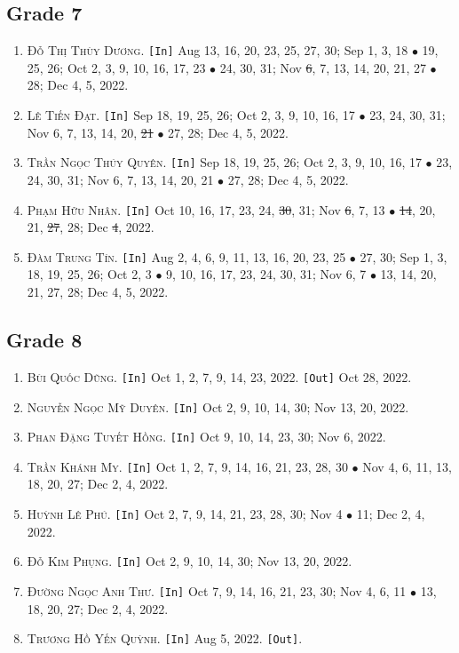 \documentclass{article}
\numberwithin{equation}{section}
\begin{document}
\subsection{Grade 7}
\begin{enumerate}
	\item \textsc{Đỗ Thị Thùy Dương.} \texttt{[In]} Aug 13, 16, 20, 23, 25, 27, 30; Sep 1, 3, 18 $\bullet$ 19, 25, 26; Oct 2, 3, 9, 10, 16, 17, 23 $\bullet$ 24, 30, 31; Nov \st{6}, 7, 13, 14, 20, 21, 27 $\bullet$ 28; Dec 4, 5, 2022.
	\item \textsc{Lê Tiến Đạt.} \texttt{[In]} Sep 18, 19, 25, 26; Oct 2, 3, 9, 10, 16, 17 $\bullet$ 23, 24, 30, 31; Nov 6, 7, 13, 14, 20, \st{21} $\bullet$ 27, 28; Dec 4, 5, 2022.
	\item \textsc{Trần Ngọc Thúy Quyên.} \texttt{[In]} Sep 18, 19, 25, 26; Oct 2, 3, 9, 10, 16, 17 $\bullet$ 23, 24, 30, 31; Nov 6, 7, 13, 14, 20, 21 $\bullet$ 27, 28; Dec 4, 5, 2022.
	\item \textsc{Phạm Hữu Nhân.} \texttt{[In]} Oct 10, 16, 17, 23, 24, \st{30}, 31; Nov \st{6}, 7, 13 $\bullet$ \st{14}, 20, 21, \st{27}, 28; Dec \st{4}, 2022.
	\item \textsc{Đàm Trung Tín.} \texttt{[In]} Aug 2, 4, 6, 9, 11, 13, 16, 20, 23, 25 $\bullet$ 27, 30; Sep 1, 3, 18, 19, 25, 26; Oct 2, 3 $\bullet$ 9, 10, 16, 17, 23, 24, 30, 31; Nov 6, 7 $\bullet$ 13, 14, 20, 21, 27, 28; Dec 4, 5, 2022.
\end{enumerate}

\subsection{Grade 8}
\begin{enumerate}
	\item \textsc{Bùi Quốc Dũng.} \texttt{[In]} Oct 1, 2, 7, 9, 14, 23, 2022. \texttt{[Out]} Oct 28, 2022.
	\item \textsc{Nguyễn Ngọc Mỹ Duyên.} \texttt{[In]} Oct 2, 9, 10, 14, 30; Nov 13, 20, 2022.
	\item \textsc{Phan Đặng Tuyết Hồng.} \texttt{[In]} Oct 9, 10, 14, 23, 30; Nov 6, 2022.
	\item \textsc{Trần Khánh My.} \texttt{[In]} Oct 1, 2, 7, 9, 14, 16, 21, 23, 28, 30 $\bullet$ Nov 4, 6, 11, 13, 18, 20, 27; Dec 2, 4, 2022.
	\item \textsc{Huỳnh Lê Phú.} \texttt{[In]} Oct 2, 7, 9, 14, 21, 23, 28, 30; Nov 4 $\bullet$ 11; Dec 2, 4, 2022.
	\item \textsc{Đỗ Kim Phụng.} \texttt{[In]} Oct 2, 9, 10, 14, 30; Nov 13, 20, 2022.
	\item \textsc{Đường Ngọc Anh Thư.} \texttt{[In]} Oct 7, 9, 14, 16, 21, 23, 30; Nov 4, 6, 11 $\bullet$ 13, 18, 20, 27; Dec 2, 4, 2022.
	\item \textsc{Trương Hồ Yến Quỳnh.} \texttt{[In]} Aug 5, 2022. \texttt{[Out]}.
\end{enumerate}
\end{document}

